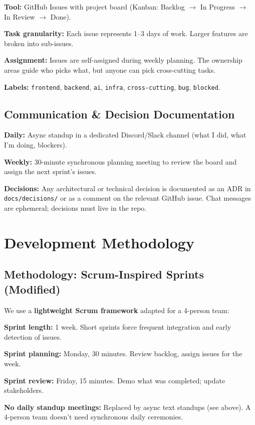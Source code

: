 \documentclass[10pt, a4paper]{article}
\begin{document}
\begin{speclist}
\item \textbf{Tool:} GitHub Issues with project board (Kanban: Backlog $\to$ In Progress $\to$ In Review $\to$ Done).
\item \textbf{Task granularity:} Each issue represents 1--3 days of work. Larger features are broken into sub-issues.
\item \textbf{Assignment:} Issues are self-assigned during weekly planning. The ownership areas guide who picks what, but anyone can pick cross-cutting tasks.
\item \textbf{Labels:} \texttt{frontend}, \texttt{backend}, \texttt{ai}, \texttt{infra}, \texttt{cross-cutting}, \texttt{bug}, \texttt{blocked}.
\end{speclist}

\subsection{Communication \& Decision Documentation}

\begin{speclist}
\item \textbf{Daily:} Async standup in a dedicated Discord/Slack channel (what I did, what I'm doing, blockers).
\item \textbf{Weekly:} 30-minute synchronous planning meeting to review the board and assign the next sprint's issues.
\item \textbf{Decisions:} Any architectural or technical decision is documented as an ADR in \texttt{docs/decisions/} or as a comment on the relevant GitHub issue. Chat messages are ephemeral; decisions must live in the repo.
\end{speclist}


\section{Development Methodology}

\subsection{Methodology: Scrum-Inspired Sprints (Modified)}

We use a \textbf{lightweight Scrum framework} adapted for a 4-person team:

\begin{speclist}
\item \textbf{Sprint length:} 1 week. Short sprints force frequent integration and early detection of issues.
\item \textbf{Sprint planning:} Monday, 30 minutes. Review backlog, assign issues for the week.
\item \textbf{Sprint review:} Friday, 15 minutes. Demo what was completed; update stakeholders.
\item \textbf{No daily standup meetings:} Replaced by async text standups (see above). A 4-person team doesn't need synchronous daily ceremonies.
\end{speclist}
\end{document}
